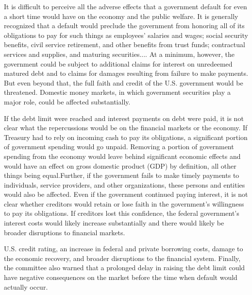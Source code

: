 \begin{displayquote}
It is difficult to perceive all the adverse effects that a government default for even a short time would have on the economy and the public welfare. It is generally recognized that a default would preclude the government from honoring all of its obligations to pay for such things as employees’ salaries and wages; social security benefits, civil service retirement, and other benefits from trust funds; contractual services and supplies, and maturing securities.... At a minimum, however, the government could be subject to additional claims for interest on unredeemed matured debt and to claims for damages resulting from failure to make payments. But even beyond that, the full faith and credit of the U.S. government would be threatened. Domestic money markets, in which government securities play a major role, could be affected substantially.
\end{displayquote}

If the debt limit were reached and interest payments on debt were paid, it is not clear what the repercussions would be on the financial markets or the economy. If Treasury had to rely on incoming cash to pay its obligations, a significant portion of government spending would go unpaid. Removing a portion of government spending from the economy would leave behind significant economic effects and would have an effect on gross domestic product (GDP) by definition, all other things being equal.Further, if the government fails to make timely payments to individuals, service providers, and other organizations, these persons and entities would also be affected. Even if the government continued paying interest, it is not clear whether creditors would retain or lose faith in the government’s willingness to pay its obligations. If creditors lost this confidence, the federal government’s interest costs would likely increase substantially and there would likely be broader disruptions to financial markets.

U.S. credit rating, an increase in federal and private borrowing costs, damage to the economic recovery, and broader disruptions to the financial system. Finally, the committee also warned that a prolonged delay in raising the debt limit could have negative consequences on the market before the time when default would actually occur.
